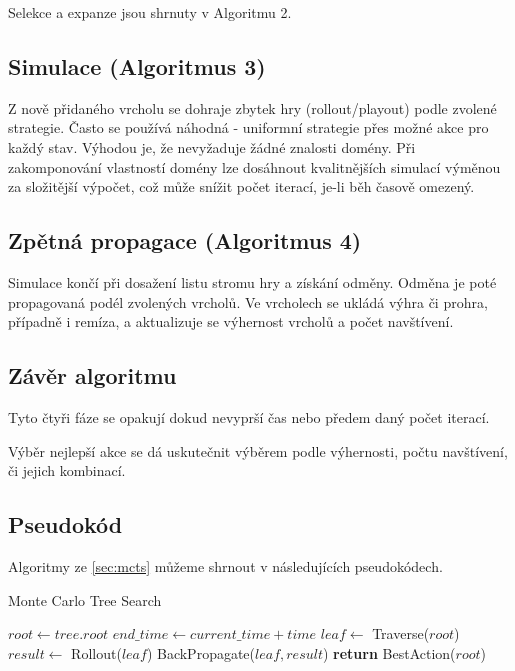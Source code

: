 Selekce a expanze jsou shrnuty v Algoritmu 2. 
\subsection{Simulace (Algoritmus 3)}
Z nově přidaného vrcholu se dohraje zbytek hry (rollout/playout) podle zvolené strategie. Často se používá náhodná - uniformní strategie přes možné akce pro každý stav. Výhodou je, že nevyžaduje žádné znalosti domény. Při zakomponování vlastností domény lze dosáhnout kvalitnějších simulací výměnou za složitější výpočet, což může snížit počet iterací, je-li běh časově omezený.

\subsection{Zpětná propagace (Algoritmus 4)}
Simulace končí při dosažení listu stromu hry a získání odměny. Odměna je poté propagovaná podél zvolených vrcholů. Ve vrcholech se ukládá výhra či prohra, případně i remíza, a aktualizuje se výhernost vrcholů a počet navštívení.  

\subsection{Závěr algoritmu}
Tyto čtyři fáze se opakují dokud nevyprší čas nebo předem daný počet iterací.  

Výběr nejlepší akce se dá uskutečnit výběrem podle výhernosti, počtu navštívení, či jejich kombinací.

\subsection{Pseudokód}\label{sub:mcts}
Algoritmy ze \cref{sec:mcts} můžeme shrnout v následujících pseudokódech. 

\begin{algorithm}
\caption{Monte Carlo Tree Search}
\begin{algorithmic}[1]
    \State $root \gets tree.root$
    \State $end\_time \gets current\_time + time$
        \State $leaf \gets$ Traverse($root$)
        \State $result \gets$ Rollout($leaf$)
        \State BackPropagate($leaf, result$)
    \EndWhile
    \State \textbf{return} BestAction($root$) 
\EndFunction
\end{algorithmic}
\end{algorithm}


